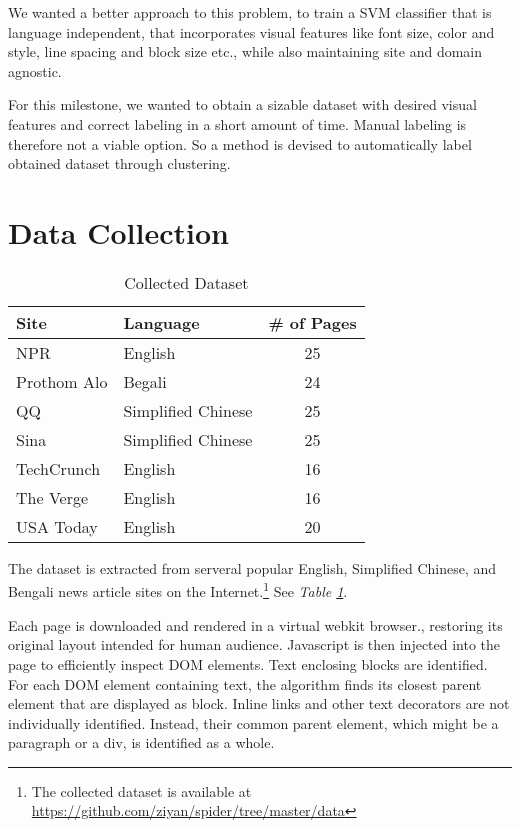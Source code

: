 \documentclass{acm_proc_article-sp}
\begin{document}
We wanted a better approach to this problem, to train a SVM classifier that is language independent, that incorporates visual features like font size, color and style, line spacing and block size etc., while also maintaining site and domain agnostic.

For this milestone, we wanted to obtain a sizable dataset with desired visual features and correct labeling in a short amount of time. Manual labeling is therefore not a viable option. So a method is devised to automatically label obtained dataset through clustering.

\section{Data Collection}

\begin{table}
\centering
\caption{\label{table:dataset}Collected Dataset}
\begin{tabular}{|l|l|c|} \hline
Site&Language&\# of Pages\\ \hline\hline
NPR&English&25\\ \hline
Prothom Alo&Begali&24\\ \hline
QQ&Simplified Chinese&25\\ \hline
Sina&Simplified Chinese&25\\ \hline
TechCrunch&English&16\\ \hline
The Verge&English&16\\ \hline
USA Today&English&20\\ \hline
\end{tabular}
\end{table}

The dataset is extracted from serveral popular English, Simplified Chinese, and Bengali news article sites on the Internet.\footnote{The collected dataset is available at \url{https://github.com/ziyan/spider/tree/master/data}} See \emph{Table \ref{table:dataset}}.

Each page is downloaded and rendered in a virtual webkit browser.\cite{phantomjs}, restoring its original layout intended for human audience. Javascript is then injected into the page to efficiently inspect DOM elements. Text enclosing blocks are identified. For each DOM element containing text, the algorithm finds its closest parent element that are displayed as block. Inline links and other text decorators are not individually identified. Instead, their common parent element, which might be a paragraph or a div, is identified as a whole.
\end{document}
